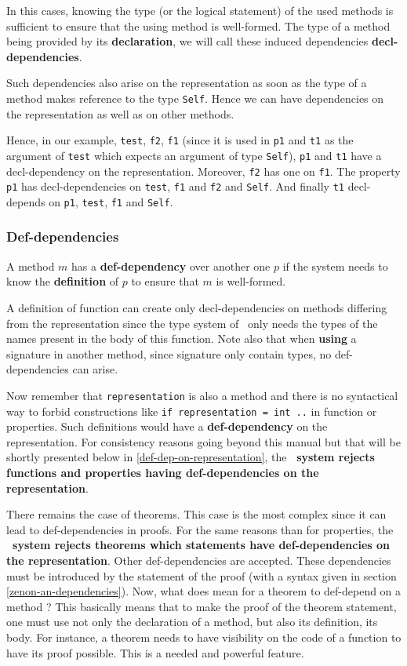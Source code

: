 In this cases, knowing the type (or the logical statement) of the used methods is sufficient to
ensure that the using method is well-formed. The type of a
method being provided by its {\bf declaration}, we will call these induced
dependencies {\bf decl-dependencies}.

Such dependencies also arise on the representation as soon as the type
of a method makes reference to the type {\tt Self}. Hence we can have
dependencies on the representation as well as on other methods.

Hence, in our example, {\tt test}, {\tt f2}, {\tt f1} (since it is
used in {\tt p1} and {\tt t1} as the argument of {\tt test} which expects
an argument of type {\tt Self}), {\tt p1} and {\tt t1} have a
decl-dependency on the representation. Moreover, {\tt f2} has one on
{\tt f1}. The property {\tt p1} has decl-dependencies on {\tt test},
{\tt f1} and {\tt f2} and {\tt Self}. And finally {\tt t1} decl-depends on {\tt p1},
{\tt test}, {\tt f1} and {\tt Self}.



\subsubsection{Def-dependencies}
\label{def-dependency}
A method $m$ has a 
{\bf def-dependency} over another one $p$ if the system needs to
know the {\bf definition} of $p$   to ensure that $m$ is well-formed.

A definition of function can create  only decl-dependencies on
methods differing from the representation since the type system of
\focal\ only needs the types of the names present in the body of this
function. Note also that when {\bf using} a signature in another
method, since signature only contain types, no def-dependencies can
arise.

Now remember that {\tt representation} is also a method and there is
no syntactical way to forbid constructions like {\tt if representation
  = int ..} in function or properties. Such definitions would have a
{\bf def-dependency} on the representation.  For consistency reasons going beyond this manual
but that will be shortly presented below in
\ref{def-dep-on-representation}, the {\bf \focal\ system rejects
  functions and properties having def-dependencies on the
  representation}.

\smallskip There remains the case of theorems. This case is the most
complex since it can lead to def-dependencies in proofs.  For the same
reasons than for properties, the {\bf \focal\ system rejects theorems
  which statements have def-dependencies on the representation}. Other
def-dependencies are accepted.  These dependencies must be introduced
by the statement of the proof (with a syntax given in section
\ref{zenon-an-dependencies}).  Now, what does mean for a theorem to
def-depend on a method ? This basically means that to make the proof
of the theorem statement, one must use not only the declaration of a
method, but also its definition, its body. For instance, a theorem
needs to have visibility on the code of a function to have its proof
possible. This is a needed and powerful feature.




